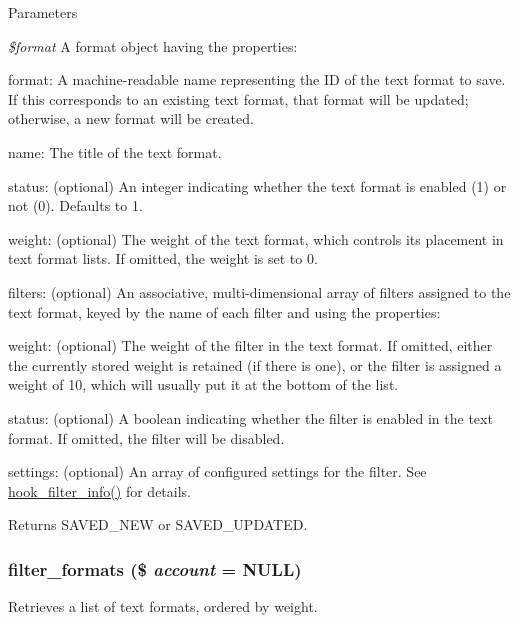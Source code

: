 \begin{DoxyParams}{Parameters}
\item[{\em \$format}]A format object having the properties:
\begin{DoxyItemize}
\item format: A machine-\/readable name representing the ID of the text format to save. If this corresponds to an existing text format, that format will be updated; otherwise, a new format will be created.
\item name: The title of the text format.
\item status: (optional) An integer indicating whether the text format is enabled (1) or not (0). Defaults to 1.
\item weight: (optional) The weight of the text format, which controls its placement in text format lists. If omitted, the weight is set to 0.
\item filters: (optional) An associative, multi-\/dimensional array of filters assigned to the text format, keyed by the name of each filter and using the properties:
\begin{DoxyItemize}
\item weight: (optional) The weight of the filter in the text format. If omitted, either the currently stored weight is retained (if there is one), or the filter is assigned a weight of 10, which will usually put it at the bottom of the list.
\item status: (optional) A boolean indicating whether the filter is enabled in the text format. If omitted, the filter will be disabled.
\item settings: (optional) An array of configured settings for the filter. See \hyperlink{group__hooks_gaf2a2f2a46589420df896a0d42247f15a}{hook\_\-filter\_\-info()} for details.
\end{DoxyItemize}
\end{DoxyItemize}\end{DoxyParams}
\begin{DoxyReturn}{Returns}
SAVED\_\-NEW or SAVED\_\-UPDATED. 
\end{DoxyReturn}
\hypertarget{filter_8module_a9768cd98262e5de87ebcc1b2bb507b7b}{
\subsubsection[{filter\_\-formats}]{\setlength{\rightskip}{0pt plus 5cm}filter\_\-formats (\$ {\em account} = {\ttfamily NULL})}}
\label{filter_8module_a9768cd98262e5de87ebcc1b2bb507b7b}
Retrieves a list of text formats, ordered by weight.


